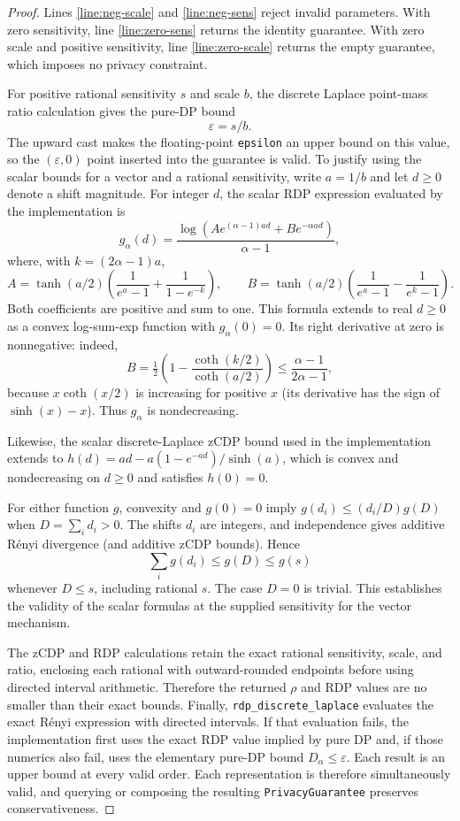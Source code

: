 \documentclass{article}
\begin{document}
\begin{proof}
Lines \ref{line:neg-scale} and \ref{line:neg-sens} reject invalid
parameters. With zero sensitivity, line \ref{line:zero-sens} returns the
identity guarantee. With zero scale and positive sensitivity, line \ref{line:zero-scale}
returns the empty guarantee, which imposes no privacy constraint.

For positive rational sensitivity $s$ and scale $b$, the discrete Laplace
point-mass ratio calculation gives the pure-DP bound
\[
    \varepsilon = s/b.
\]
The upward cast makes the floating-point \texttt{epsilon} an upper bound on
this value, so the $(\varepsilon,0)$ point inserted into the guarantee is valid.
To justify using the scalar bounds for a vector and a rational sensitivity,
write $a=1/b$ and let $d\geq 0$ denote a shift magnitude. For integer $d$,
the scalar RDP expression evaluated by the implementation is
\[
   g_\alpha(d)=\frac{\log(A e^{(\alpha-1)ad}+B e^{-\alpha ad})}{\alpha-1},
\]
where, with $k=(2\alpha-1)a$,
\[
 A=\tanh(a/2)\left(\frac{1}{e^a-1}+\frac{1}{1-e^{-k}}\right),
 \qquad
 B=\tanh(a/2)\left(\frac{1}{e^a-1}-\frac{1}{e^k-1}\right).
\]
Both coefficients are positive and sum to one. This formula extends to real
$d\geq0$ as a convex log-sum-exp function with $g_\alpha(0)=0$.
Its right derivative at zero is nonnegative: indeed,
\[
 B=\tfrac12\left(1-\frac{\coth(k/2)}{\coth(a/2)}\right)
 \leq \frac{\alpha-1}{2\alpha-1},
\]
because $x\coth(x/2)$ is increasing for positive $x$ (its derivative
has the sign of $\sinh(x)-x$). Thus $g_\alpha$ is nondecreasing.

Likewise, the scalar discrete-Laplace zCDP bound used in the implementation
extends to $h(d)=ad-a(1-e^{-ad})/\sinh(a)$, which is convex and
nondecreasing on $d\geq 0$ and satisfies $h(0)=0$.

For either function $g$, convexity and $g(0)=0$ imply
$g(d_i)\leq (d_i/D)g(D)$ when $D=\sum_i d_i>0$.
The shifts $d_i$ are integers, and independence gives additive Rényi
divergence (and additive zCDP bounds). Hence
\[
    \sum_i g(d_i)\leq g(D)\leq g(s)
\]
whenever $D\leq s$, including rational $s$. The case $D=0$ is trivial.
This establishes the validity of the scalar formulas at the supplied
sensitivity for the vector mechanism.

The zCDP and RDP calculations retain the exact rational sensitivity, scale,
and ratio, enclosing each rational with outward-rounded endpoints before
using directed interval arithmetic. Therefore the returned $\rho$ and RDP
values are no smaller than their exact bounds. Finally,
\texttt{rdp\_discrete\_laplace} evaluates the exact Rényi expression with
directed intervals. If that evaluation fails,
the implementation first uses the exact RDP value implied by pure DP and, if
those numerics also fail, uses the elementary pure-DP bound
$D_\alpha \leq \varepsilon$. Each result is an upper bound at every valid
order. Each representation is therefore simultaneously valid, and querying or
composing the resulting \texttt{PrivacyGuarantee} preserves conservativeness.
\end{proof}
\end{document}
